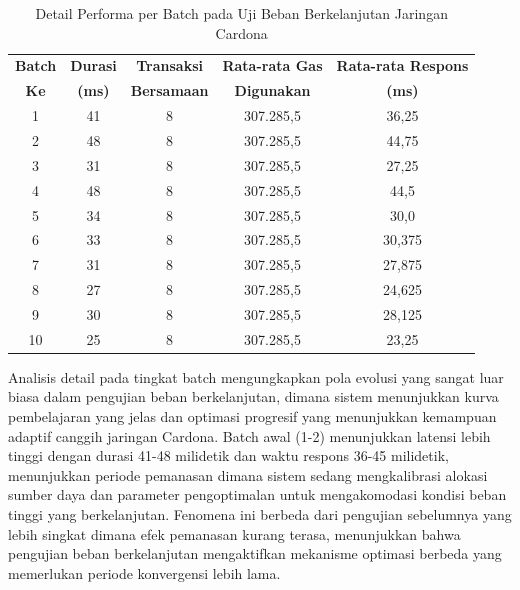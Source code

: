 \begin{table}[h!]
  \centering
  \begin{tabular}{|c|c|c|c|c|}
    \hline
    \textbf{Batch} & \textbf{Durasi} & \textbf{Transaksi} & \textbf{Rata-rata Gas} & \textbf{Rata-rata Respons} \\
    \textbf{Ke}    & \textbf{(ms)}   & \textbf{Bersamaan} & \textbf{Digunakan}     & \textbf{(ms)}              \\
    \hline
    1              & 41              & 8                  & 307.285,5              & 36,25                      \\
    2              & 48              & 8                  & 307.285,5              & 44,75                      \\
    3              & 31              & 8                  & 307.285,5              & 27,25                      \\
    4              & 48              & 8                  & 307.285,5              & 44,5                       \\
    5              & 34              & 8                  & 307.285,5              & 30,0                       \\
    6              & 33              & 8                  & 307.285,5              & 30,375                     \\
    7              & 31              & 8                  & 307.285,5              & 27,875                     \\
    8              & 27              & 8                  & 307.285,5              & 24,625                     \\
    9              & 30              & 8                  & 307.285,5              & 28,125                     \\
    10             & 25              & 8                  & 307.285,5              & 23,25                      \\
    \hline
  \end{tabular}
  \caption{Detail Performa per Batch pada Uji Beban Berkelanjutan Jaringan Cardona}
  \label{tab:sustained_load_batches}
\end{table}
Analisis detail pada tingkat batch mengungkapkan pola evolusi yang sangat luar biasa dalam pengujian beban berkelanjutan, dimana sistem menunjukkan kurva pembelajaran yang jelas dan optimasi progresif yang menunjukkan kemampuan adaptif canggih jaringan Cardona. Batch awal (1-2) menunjukkan latensi lebih tinggi dengan durasi 41-48 milidetik dan waktu respons 36-45 milidetik, menunjukkan periode pemanasan dimana sistem sedang mengkalibrasi alokasi sumber daya dan parameter pengoptimalan untuk mengakomodasi kondisi beban tinggi yang berkelanjutan. Fenomena ini berbeda dari pengujian sebelumnya yang lebih singkat dimana efek pemanasan kurang terasa, menunjukkan bahwa pengujian beban berkelanjutan mengaktifkan mekanisme optimasi berbeda yang memerlukan periode konvergensi lebih lama.
